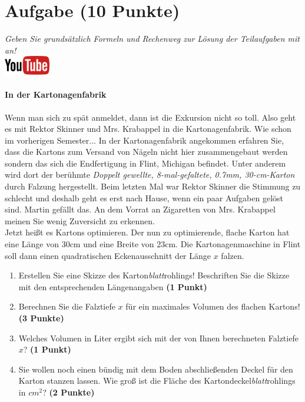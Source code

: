 \documentclass[a4paper, 10pt]{scrartcl}\usepackage[]{graphicx}\usepackage[]{xcolor}
\begin{document}
 
\clearpage

\section{Aufgabe \hfill (10 Punkte)}

\textit{Geben Sie grunds{\"a}tzlich Formeln und Rechenweg zur L{\"o}sung der
  Teilaufgaben mit an!} \\[1Ex]

\hfill\href{https://youtu.be/RuzMjwvwT-4}{\includegraphics[width =
  2cm]{img/youtube}} %
\hspace{2Ex}

\paragraph{In der Kartonagenfabrik}



Wenn man sich zu sp{\"a}t anmeldet, dann ist die Exkursion nicht so toll. Also
geht es mit Rektor Skinner und Mrs. Krabappel in die Kartonagenfabrik. Wie
schon im vorherigen Semester... In der Kartonagenfabrik angekommen erfahren
Sie, dass die Kartons zum Versand von N{\"a}geln nicht hier zusammengebaut
werden sondern das sich die Endfertigung in Flint, Michigan befindet. Unter
anderem wird dort der ber{\"u}hmte \textit{Doppelt gewellte,
  8-mal-gefaltete, 0.7mm, 30-cm-Karton} durch
Falzung hergestellt. Beim letzten Mal war Rektor Skinner die Stimmung zu
schlecht und deshalb geht es erst nach Hause, wenn ein paar Aufgaben gel{\"o}st
sind. Martin gef{\"a}llt das. An dem Vorrat
an Zigaretten von Mrs. Krabappel meinen Sie wenig Zuversicht zu erkennen.\\

Jetzt hei{\ss}t es Kartons optimieren. Der nun zu optimierende, flache Karton
hat eine L{\"a}nge von 30cm und eine Breite von 23cm. Die
Kartonagenmaschine in Flint soll dann einen quadratischen Eckenausschnitt
der L{\"a}nge $x$ falzen.

\begin{enumerate}
\item Erstellen Sie eine Skizze des Karton\textit{blatt}rohlings!
  Beschriften Sie die Skizze mit den entsprechenden L{\"a}ngenangaben
  \textbf{(1 Punkt)}
\item Berechnen Sie die Falztiefe $x$ f{\"u}r ein maximales Volumen des flachen
  Kartons! \textbf{(3 Punkte)}
\item Welches Volumen in Liter ergibt sich mit der von Ihnen berechneten
  Falztiefe $x$?  \textbf{(1 Punkt)}
\item Sie wollen noch einen b{\"u}ndig mit dem Boden abschlie{\ss}enden Deckel f{\"u}r
  den Karton stanzen lassen. Wie gro{\ss} ist die Fl{\"a}che des
  Kartondeckel\textit{blatt}rohlings in $cm^2$? \textbf{(2 Punkte)}
\end{enumerate}
\end{document}
